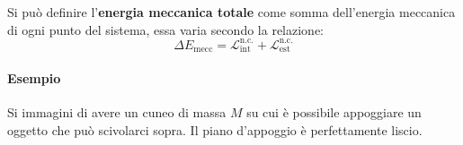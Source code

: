 \documentclass[10pt,a4paper]{book}
\begin{document}
Si può definire l'\textbf{energia meccanica totale} come somma dell'energia meccanica di ogni punto del sistema, essa varia secondo la relazione:
\[
	\Delta E_\text{mecc}=\mathcal{L}^\text{n.c.}_\text{int}+\mathcal{L}^\text{n.c.}_\text{est}
\]

\paragraph{Esempio} Si immagini di avere un cuneo di massa $M$ su cui è possibile appoggiare un oggetto che può scivolarci sopra. Il piano d'appoggio è perfettamente liscio.
\begin{figure}[htpb]
	\centering
	


	\begin{tikzpicture}[x=0.75pt,y=0.75pt,yscale=-1,xscale=1]


\end{tikzpicture}
\end{figure}
\end{document}

